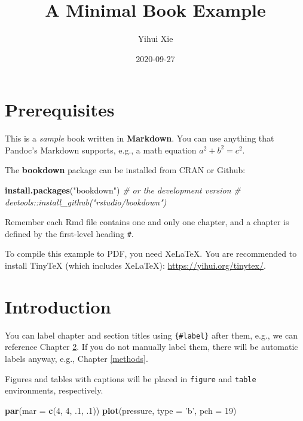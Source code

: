 \documentclass[
]{book}
\title{A Minimal Book Example}
\author{Yihui Xie}
\date{2020-09-27}
\newenvironment{Shaded}{\begin{snugshade}}{\end{snugshade}}
\newcommand{\CommentTok}[1]{\textcolor[rgb]{0.56,0.35,0.01}{\textit{#1}}}
\newcommand{\DataTypeTok}[1]{\textcolor[rgb]{0.13,0.29,0.53}{#1}}
\newcommand{\DecValTok}[1]{\textcolor[rgb]{0.00,0.00,0.81}{#1}}
\newcommand{\FloatTok}[1]{\textcolor[rgb]{0.00,0.00,0.81}{#1}}
\newcommand{\KeywordTok}[1]{\textcolor[rgb]{0.13,0.29,0.53}{\textbf{#1}}}
\newcommand{\NormalTok}[1]{#1}
\newcommand{\StringTok}[1]{\textcolor[rgb]{0.31,0.60,0.02}{#1}}
\begin{document}
\maketitle

{
\setcounter{tocdepth}{1}
\tableofcontents
}
\hypertarget{prerequisites}{%
\chapter{Prerequisites}\label{prerequisites}}

This is a \emph{sample} book written in \textbf{Markdown}. You can use anything that Pandoc's Markdown supports, e.g., a math equation \(a^2 + b^2 = c^2\).

The \textbf{bookdown} package can be installed from CRAN or Github:

\begin{Shaded}
\begin{Highlighting}[]
\KeywordTok{install.packages}\NormalTok{(}\StringTok{"bookdown"}\NormalTok{)}
\CommentTok{# or the development version}
\CommentTok{# devtools::install_github("rstudio/bookdown")}
\end{Highlighting}
\end{Shaded}

Remember each Rmd file contains one and only one chapter, and a chapter is defined by the first-level heading \texttt{\#}.

To compile this example to PDF, you need XeLaTeX. You are recommended to install TinyTeX (which includes XeLaTeX): \url{https://yihui.org/tinytex/}.

\hypertarget{intro}{%
\chapter{Introduction}\label{intro}}

You can label chapter and section titles using \texttt{\{\#label\}} after them, e.g., we can reference Chapter \ref{intro}. If you do not manually label them, there will be automatic labels anyway, e.g., Chapter \ref{methods}.

Figures and tables with captions will be placed in \texttt{figure} and \texttt{table} environments, respectively.

\begin{Shaded}
\begin{Highlighting}[]
\KeywordTok{par}\NormalTok{(}\DataTypeTok{mar =} \KeywordTok{c}\NormalTok{(}\DecValTok{4}\NormalTok{, }\DecValTok{4}\NormalTok{, }\FloatTok{.1}\NormalTok{, }\FloatTok{.1}\NormalTok{))}
\KeywordTok{plot}\NormalTok{(pressure, }\DataTypeTok{type =} \StringTok{'b'}\NormalTok{, }\DataTypeTok{pch =} \DecValTok{19}\NormalTok{)}
\end{Highlighting}
\end{Shaded}
\end{document}
